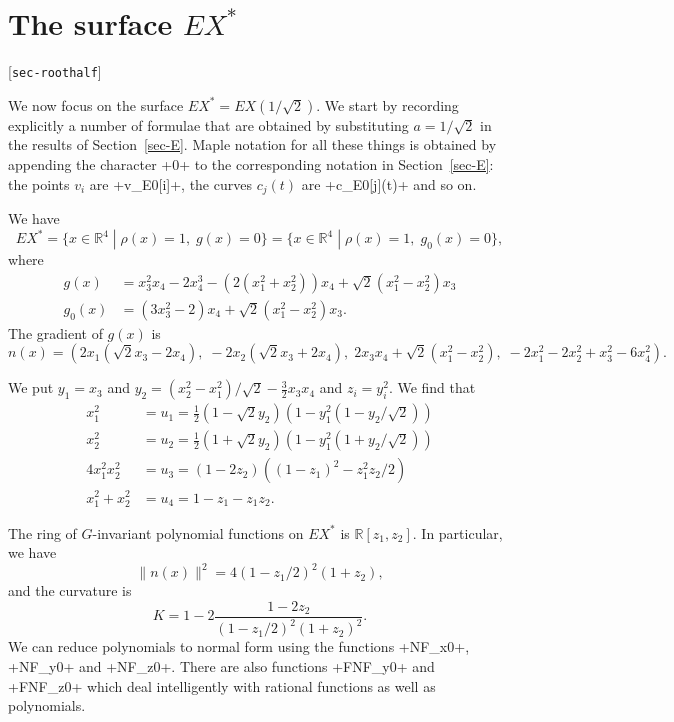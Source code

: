 \documentclass[reqno]{amsart}
\newcommand{\lbl}[1]{\label{#1}\textup{[\texttt{#1}]}\par}
\newcommand{\lbl}{\label}
\newcommand{\R}         {{\mathbb{R}}}
\newcommand{\st}        {\;|\;}
\newcommand{\half}      {\tfrac{1}{2}}
\newcommand{\rt}        {\sqrt{2}}
\renewcommand{\:}{\colon}
\theoremstyle{definition}
\begin{document}
\section{The surface \texorpdfstring{$EX^*$}{EX*}}
\lbl{sec-roothalf}

We now focus on the surface $EX^*=EX(1/\rt)$.  We start by recording
explicitly a number of formulae that are obtained by substituting
$a=1/\rt$ in the results of Section~\ref{sec-E}.  Maple
notation for all these things is obtained by appending the character
\mcode+0+ to the corresponding notation in Section~\ref{sec-E}:
the points $v_i$ are \mcode+v_E0[i]+, the curves $c_j(t)$ are
\mcode+c_E0[j](t)+ and so on.

We have
\[ EX^* = \{x\in \R^4\st \rho(x)=1,\;g(x)=0\}
        = \{x\in \R^4\st \rho(x)=1,\;g_0(x)=0\},
\]
where
\begin{align*}
 g(x)   &= x_3^2x_4-2x_4^3-(2(x_1^2+x_2^2))x_4+\rt(x_1^2-x_2^2)x_3 \\
 g_0(x) &= (3x_3^2-2)x_4+\rt(x_1^2-x_2^2)x_3.
\end{align*}
The gradient of $g(x)$ is
\[ n(x) = \left(
     2x_1(\rt x_3-2x_4),\;
    -2x_2(\rt x_3+2x_4),\;
     2x_3x_4+\rt(x_1^2-x_2^2),\;
     -2x_1^2-2x_2^2+x_3^2-6x_4^2
   \right).
\]

We put $y_1=x_3$ and $y_2=(x_2^2-x_1^2)/\rt-\tfrac{3}{2}x_3x_4$ and
$z_i=y_i^2$.  We find that
\begin{align*}
 x_1^2 &= u_1= \half(1-\rt y_2)(1-y_1^2(1-y_2/\rt)) \\
 x_2^2 &= u_2= \half(1+\rt y_2)(1-y_1^2(1+y_2/\rt)) \\
 4x_1^2x_2^2 &= u_3 = (1-2z_2)((1-z_1)^2-z_1^2z_2/2) \\
 x_1^2+x_2^2 &= u_4 = 1-z_1-z_1z_2.
\end{align*}

The ring of $G$-invariant polynomial functions on $EX^*$ is $\R[z_1,z_2]$.
In particular, we have
\[ \|n(x)\|^2 = 4 (1-z_1/2)^2(1+z_2), \]
and the curvature is
\[ K = 1 - 2 \frac{1-2z_2}{(1-z_1/2)^2(1+z_2)^2}. \]
We can reduce polynomials to normal form using the functions
\mcode+NF_x0+, \mcode+NF_y0+ and \mcode+NF_z0+.  There are also
functions \mcode+FNF_y0+ and \mcode+FNF_z0+ which deal intelligently
with rational functions as well as polynomials.
\end{document}
